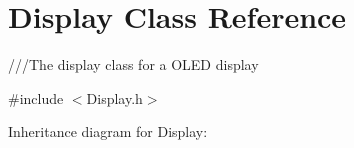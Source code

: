 \hypertarget{classDisplay}{}\section{Display Class Reference}
\label{classDisplay}


///\+The display class for a O\+L\+ED display  




{\ttfamily \#include $<$Display.\+h$>$}



Inheritance diagram for Display\+:
